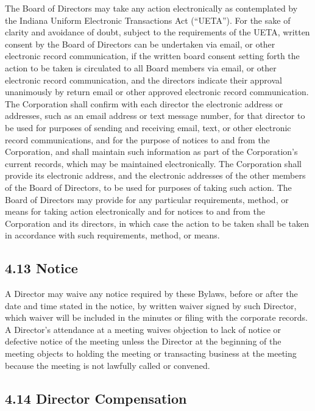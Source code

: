 \documentclass[
]{book}
\begin{document}
The Board of Directors may take any action electronically as contemplated by the Indiana Uniform Electronic Transactions Act (``UETA''). For the sake of clarity and avoidance of doubt, subject to the requirements of the UETA, written consent by the Board of Directors can be undertaken via email, or other electronic record communication, if the written board consent setting forth the action to be taken is circulated to all Board members via email, or other electronic record communication, and the directors indicate their approval unanimously by return email or other approved electronic record communication. The Corporation shall confirm with each director the electronic address or addresses, such as an email address or text message number, for that director to be used for purposes of sending and receiving email, text, or other electronic record communications, and for the purpose of notices to and from the Corporation, and shall maintain such information as part of the Corporation's current records, which may be maintained electronically. The Corporation shall provide its electronic address, and the electronic addresses of the other members of the Board of Directors, to be used for purposes of taking such action. The Board of Directors may provide for any particular requirements, method, or means for taking action electronically and for notices to and from the Corporation and its directors, in which case the action to be taken shall be taken in accordance with such requirements, method, or means.

\subsection*{4.13 Notice}\label{notice}

A Director may waive any notice required by these Bylaws, before or after the date and time stated in the notice, by written waiver signed by such Director, which waiver will be included in the minutes or filing with the corporate records. A Director's attendance at a meeting waives objection to lack of notice or defective notice of the meeting unless the Director at the beginning of the meeting objects to holding the meeting or transacting business at the meeting because the meeting is not lawfully called or convened.

\subsection*{4.14 Director Compensation}\label{director-compensation}
\end{document}
